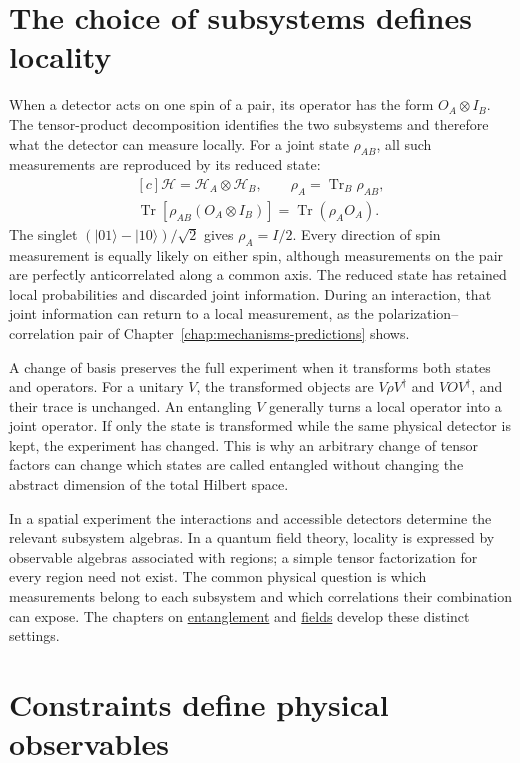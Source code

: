 \documentclass[11pt,oneside]{book}
\newenvironment{centeredalign}{\[\begin{gathered}[c]}{\end{gathered}\]}
\begin{document}
\section{The choice of subsystems defines locality}


When a detector acts on one spin of a pair, its operator has the form
\(O_A\otimes I_B\). The tensor-product decomposition identifies the two
subsystems and therefore what the detector can measure locally. For a joint
state \(\rho_{AB}\), all such measurements are reproduced by its reduced
state:
\begin{centeredalign}
\mathcal H=\mathcal H_A\otimes\mathcal H_B,\qquad
\rho_A=\operatorname{Tr}_B\rho_{AB},\\
\operatorname{Tr}[\rho_{AB}(O_A\otimes I_B)]
=\operatorname{Tr}(\rho_AO_A).
\end{centeredalign}
The singlet \((|01\rangle-|10\rangle)/\sqrt2\) gives \(\rho_A=I/2\).
Every direction of spin measurement is equally likely on either spin,
although measurements on the pair are perfectly anticorrelated along a
common axis. The reduced state has retained local probabilities and
discarded joint information. During an interaction, that joint information
can return to a local measurement, as the polarization--correlation pair of
Chapter~\ref{chap:mechanisms-predictions} shows.

A change of basis preserves the full experiment when it transforms both
states and operators. For a unitary \(V\), the transformed objects are
\(V\rho V^\dagger\) and \(VOV^\dagger\), and their trace is unchanged.
An entangling \(V\) generally turns a local operator into a joint operator.
If only the state is transformed while the same physical detector is kept,
the experiment has changed. This is why an arbitrary change of tensor
factors can change which states are called entangled without changing the
abstract dimension of the total Hilbert space.

In a spatial experiment the interactions and accessible detectors determine
the relevant subsystem algebras. In a quantum field theory, locality is
expressed by observable algebras associated with regions; a simple tensor
factorization for every region need not exist. The common physical question
is which measurements belong to each subsystem and which correlations
their combination can expose. The chapters on
\hyperref[topic:quantum-entanglement]{entanglement} and
\hyperref[topic:quantum-field-theory]{fields} develop these distinct settings.


\section{Constraints define physical observables}
\end{document}
